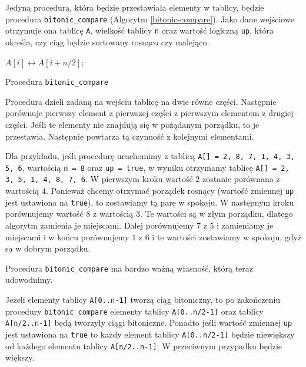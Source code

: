 Jedyną procedurą, która będzie przestawiała elementy w tablicy, będzie procedura \texttt{bitonic\_compare} (Algorytm \ref{bitonic-compare}).
Jako dane wejściowe otrzymuje ona tablicę \texttt{A}, wielkość tablicy \texttt{n} oraz wartość logiczną \texttt{up}, która określa, czy ciąg będzie sortowany rosnąco czy malejąco.
\begin{algorithm}[h]
  \DontPrintSemicolon

  
  {
    {
      $A[i] \leftrightarrow A[i+n/2]$;
    }
  }
  \caption{Procedura \texttt{bitonic\_compare}}
  \label{bitonic-compare}
\end{algorithm}
Procedura dzieli zadaną na wejściu tablicę na dwie równe części.
Następnie porównuje pierwszy element z pierwszej części z pierwszym elementem z drugiej części.
Jeśli te elementy nie znajdują się w pożądanym porządku, to je przestawia.
Następnie powtarza tą czynność z kolejnymi elementami.

Dla przykładu, jeśli procedurę uruchomimy z tablicą \texttt{A[] = 2, 8, 7, 1, 4, 3, 5, 6}, wartością \texttt{n = 8} oraz \texttt{up = true}, w wyniku otrzymamy tablicę \texttt{A[] = 2, 3, 5, 1, 4, 8, 7, 6}.
W pierwszym kroku wartość $2$ zostanie porównana z wartością $4$.
Ponieważ chcemy otrzymać porządek rosnący (wartość zmiennej \texttt{up} jest ustawiona na \texttt{true}), to zostawiamy tą parę w spokoju.
W następnym kroku porównujemy wartość $8$ z wartością $3$.
Te wartości są w złym porządku, dlatego algorytm zamienia je miejscami.
Dalej porównujemy $7$ z $5$ i zamieniamy je miejscami i w końcu porównujemy $1$ z $6$ i te wartości zostawiamy w spokoju, gdyż są w dobrym porządku.

Procedura \texttt{bitonic\_compare} ma bardzo ważną własność, którą teraz udowodnimy.

\begin{theorem}
 Jeżeli elementy tablicy \texttt{A[0..n-1]} tworzą ciąg bitoniczny, to po zakończeniu procedury \texttt{bitonic\_compare} elementy tablicy \texttt{A[0..n/2-1]} oraz tablicy \texttt{A[n/2..n-1]} będą tworzyły ciągi bitoniczne.
 Ponadto jeśli wartość zmiennej \texttt{up} jest ustawiona na \texttt{true} to każdy element tablicy \texttt{A[0..n/2-1]} będzie niewiększy od każdego elementu tablicy \texttt{A[n/2..n-1]}.
 W przeciwnym przypadku będzie większy.
 \label{bitonic-theorem}
\end{theorem}

